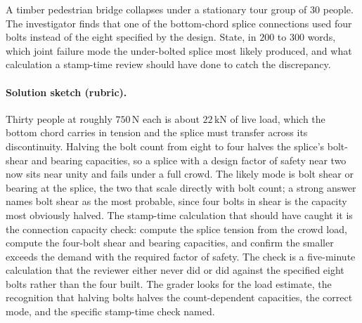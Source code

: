 \begin{exercise}
A timber pedestrian bridge collapses under a stationary tour group
of $30$ people. The investigator finds that one of the bottom-chord
splice connections used four bolts instead of the eight specified
by the design. State, in $200$ to $300$ words, which joint failure
mode the under-bolted splice most likely produced, and what
calculation a stamp-time review should have done to catch the
discrepancy.

\paragraph{Solution sketch (rubric).} Thirty people at roughly
$750\,\text{N}$ each is about $22\,\text{kN}$ of live load, which the
bottom chord carries in tension and the splice must transfer across its
discontinuity. Halving the bolt count from eight to four halves the
splice's bolt-shear and bearing capacities, so a splice with a design
factor of safety near two now sits near unity and fails under a full
crowd. The likely mode is bolt shear or bearing at the splice, the two
that scale directly with bolt count; a strong answer names bolt shear as
the most probable, since four bolts in shear is the capacity most
obviously halved. The stamp-time calculation that should have caught it
is the connection capacity check: compute the splice tension from the
crowd load, compute the four-bolt shear and bearing capacities, and
confirm the smaller exceeds the demand with the required factor of
safety. The check is a five-minute calculation that the reviewer either
never did or did against the specified eight bolts rather than the four
built. The grader looks for the load estimate, the recognition that
halving bolts halves the count-dependent capacities, the correct mode,
and the specific stamp-time check named.
\end{exercise}

